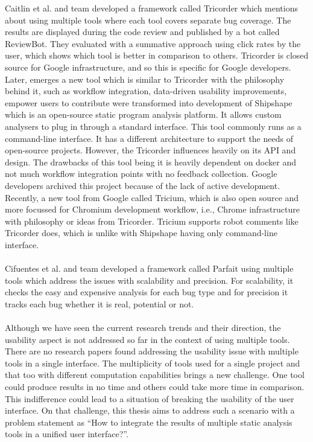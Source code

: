 Caitlin et al. and team developed a framework called Tricorder \cite{tricorder} which mentions about using multiple tools where each tool covers separate bug coverage. The results are displayed during the code review and published by a bot called ReviewBot. They evaluated with a summative approach using click rates by the user, which shows which tool is better in comparison to others. Tricorder is closed source for Google infrastructure, and so this is specific for Google developers. Later, emerges a new tool which is similar to Tricorder with the philosophy behind it, such as workflow integration, data-driven usability improvements, empower users to contribute were transformed into development of Shipshape \cite{shipshape} which is an open-source static program analysis platform. It allows custom analysers to plug in through a standard interface. This tool commonly runs as a command-line interface. It has a different architecture to support the needs of open-source projects. However, the Tricorder influences heavily on its API and design. The drawbacks of this tool being it is heavily dependent on docker and not much workflow integration points with no feedback collection. Google developers archived this project because of the lack of active development. Recently, a new tool from Google called Tricium, \cite{tricium} which is also open source and more focussed for Chromium development workflow, i.e., Chrome infrastructure with philosophy or ideas from Tricorder. Tricium supports robot comments like Tricorder does, which is unlike with Shipshape having only command-line interface. \\ \\

Cifuentes et al. and team developed a framework called Parfait \cite{parfait} using multiple tools which address the issues with scalability and precision. For scalability, it checks the easy and expensive analysis for each bug type and for precision it tracks each bug whether it is real, potential or not. \\ \\

Although we have seen the current research trends and their direction, the usability aspect is not addressed so far in the context of using multiple tools. There are no research papers found addressing the usability issue with multiple tools in a single interface. The multiplicity of tools used for a single project and that too with different computation capabilities brings a new challenge. One tool could produce results in no time and others could take more time in comparison. This indifference could lead to a situation of breaking the usability of the user interface. On that challenge, this thesis aims to address such a scenario with a problem statement as “How to integrate the results of multiple static analysis tools in a unified user interface?”. \\ \\

